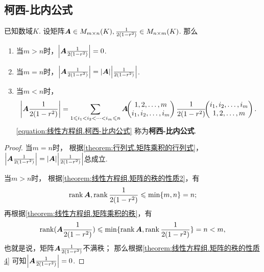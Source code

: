 \subsection{柯西-比内公式}
\begin{theorem}
已知数域\(K\).
设矩阵\(\boldsymbol{A} \in M_{m \times n}(K),
\frac{1}{2(1-r^2)} \in M_{n \times m}(K)\).
那么\begin{enumerate}
\item 当\(m > n\)时，\(\abs{\boldsymbol{A}\frac{1}{2(1-r^2)}} = 0\).
\item 当\(m = n\)时，\(\abs{\boldsymbol{A}\frac{1}{2(1-r^2)}} = \abs{\boldsymbol{A}} \abs{\frac{1}{2(1-r^2)}}\).
\item 当\(m < n\)时，\begin{equation}\label{equation:线性方程组.柯西-比内公式}
\abs{\boldsymbol{A}\frac{1}{2(1-r^2)}}
= \sum\limits_{1 \leqslant i_1 < i_2 < \dotsb < i_m \leqslant n}
\boldsymbol{A}\kern-3.8pt\begin{pmatrix}
	1,2,\dotsc,m \\
	i_1,i_2,\dotsc,i_m
\end{pmatrix}
\frac{1}{2(1-r^2)}\kern-3.8pt\begin{pmatrix}
	i_1,i_2,\dotsc,i_m \\
	1,2,\dotsc,m
\end{pmatrix}.
\end{equation}
\rm\cref{equation:线性方程组.柯西-比内公式} 称为\textbf{柯西-比内公式}.
\end{enumerate}
\begin{proof}
当\(m=n\)时，
根据\cref{theorem:行列式.矩阵乘积的行列式}，
\(\abs{\boldsymbol{A}\frac{1}{2(1-r^2)}} = \abs{\boldsymbol{A}} \abs{\frac{1}{2(1-r^2)}}\)总成立.

当\(m>n\)时，
根据\cref{theorem:线性方程组.矩阵的秩的性质2}，有\[\rank\boldsymbol{A},\rank\frac{1}{2(1-r^2)} \leqslant \min\{m,n\} = n;\]
再根据\cref{theorem:线性方程组.矩阵乘积的秩}，有\[\rank(\boldsymbol{A}\frac{1}{2(1-r^2)}) \leqslant \min\{\rank\boldsymbol{A},\rank\frac{1}{2(1-r^2)}\} = n < m,\]
也就是说，矩阵\(\boldsymbol{A}\frac{1}{2(1-r^2)}\)不满秩；
那么根据\cref{theorem:线性方程组.矩阵的秩的性质4} 可知\(\abs{\boldsymbol{A}\frac{1}{2(1-r^2)}} = 0\).


\end{proof}
\end{theorem}
